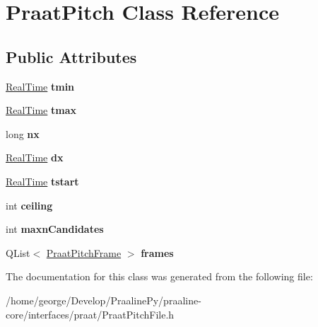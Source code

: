 \hypertarget{class_praat_pitch}{}\section{Praat\+Pitch Class Reference}
\label{class_praat_pitch}
\subsection*{Public Attributes}
\begin{DoxyCompactItemize}
\item 
\mbox{\label{class_praat_pitch_a82e9669ec91c2253f9ea38210396847b}} 
\hyperlink{struct_real_time}{Real\+Time} {\bfseries tmin}
\item 
\mbox{\label{class_praat_pitch_ae9a3f8a5a7097411983df1a0bfe6dc9e}} 
\hyperlink{struct_real_time}{Real\+Time} {\bfseries tmax}
\item 
\mbox{\label{class_praat_pitch_ab8af84ed146f96b7d7859be1a6d1ac74}} 
long {\bfseries nx}
\item 
\mbox{\label{class_praat_pitch_a1b8cb1e6014141f6426fab8f4236a960}} 
\hyperlink{struct_real_time}{Real\+Time} {\bfseries dx}
\item 
\mbox{\label{class_praat_pitch_a053168678ea4c74a9b2a1b9399d85b31}} 
\hyperlink{struct_real_time}{Real\+Time} {\bfseries tstart}
\item 
\mbox{\label{class_praat_pitch_a96803778777d80e0917399755eb92860}} 
int {\bfseries ceiling}
\item 
\mbox{\label{class_praat_pitch_aa13e2b82ee5b390c7ba09a32fec72d9a}} 
int {\bfseries maxn\+Candidates}
\item 
\mbox{\label{class_praat_pitch_a981a071f6592a4a4ba2cfa2ba8197c4c}} 
Q\+List$<$ \hyperlink{class_praat_pitch_frame}{Praat\+Pitch\+Frame} $>$ {\bfseries frames}
\end{DoxyCompactItemize}


The documentation for this class was generated from the following file\+:\begin{DoxyCompactItemize}
\item 
/home/george/\+Develop/\+Praaline\+Py/praaline-\/core/interfaces/praat/Praat\+Pitch\+File.\+h\end{DoxyCompactItemize}
